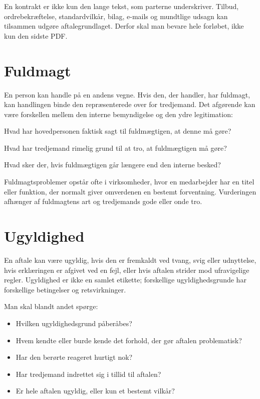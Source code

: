En kontrakt er ikke kun den lange tekst, som parterne underskriver. Tilbud, ordrebekræftelse, standardvilkår, bilag, e-mails og mundtlige udsagn kan tilsammen udgøre aftalegrundlaget. Derfor skal man bevare hele forløbet, ikke kun den sidste PDF.

\section{Fuldmagt}

En person kan handle på en andens vegne. Hvis den, der handler, har fuldmagt, kan handlingen binde den repræsenterede over for tredjemand. Det afgørende kan være forskellen mellem den interne bemyndigelse og den ydre legitimation:

\begin{description}[style=nextline,leftmargin=0pt,labelindent=0pt]
  \item[Intern bemyndigelse] Hvad har hovedpersonen faktisk sagt til fuldmægtigen, at denne må gøre?
  \item[Legitimation] Hvad har tredjemand rimelig grund til at tro, at fuldmægtigen må gøre?
  \item[Overskridelse] Hvad sker der, hvis fuldmægtigen går længere end den interne besked?
\end{description}

Fuldmagtsproblemer opstår ofte i virksomheder, hvor en medarbejder har en titel eller funktion, der normalt giver omverdenen en bestemt forventning. Vurderingen afhænger af fuldmagtens art og tredjemands gode eller onde tro.

\section{Ugyldighed}

En aftale kan være ugyldig, hvis den er fremkaldt ved tvang, svig eller udnyttelse, hvis erklæringen er afgivet ved en fejl, eller hvis aftalen strider mod ufravigelige regler. Ugyldighed er ikke en samlet etikette; forskellige ugyldighedsgrunde har forskellige betingelser og retsvirkninger.

Man skal blandt andet spørge:
\begin{itemize}
  \item Hvilken ugyldighedsgrund påberåbes?
  \item Hvem kendte eller burde kende det forhold, der gør aftalen problematisk?
  \item Har den berørte reageret hurtigt nok?
  \item Har tredjemand indrettet sig i tillid til aftalen?
  \item Er hele aftalen ugyldig, eller kun et bestemt vilkår?
\end{itemize}

